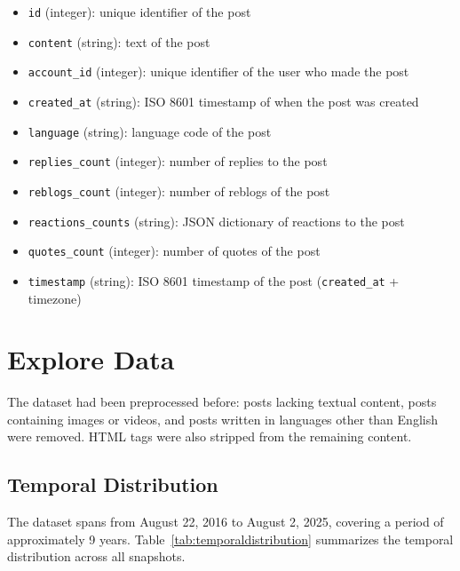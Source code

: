 \begin{itemize}
	\item \texttt{id} (integer): unique identifier of the post
	\item \texttt{content} (string): text of the post
	\item \texttt{account\_id} (integer): unique identifier of the user who made the post
	\item \texttt{created\_at} (string): ISO 8601 timestamp of when the post was created
	\item \texttt{language} (string): language code of the post
	\item \texttt{replies\_count} (integer): number of replies to the post
	\item \texttt{reblogs\_count} (integer): number of reblogs of the post
	\item \texttt{reactions\_counts} (string): JSON dictionary of reactions to the post
	\item \texttt{quotes\_count} (integer): number of quotes of the post
	\item \texttt{timestamp} (string): ISO 8601 timestamp of the post (\texttt{created\_at} + timezone)
\end{itemize}


\section{Explore Data}


The dataset had been preprocessed before: posts lacking textual content, posts containing images or videos, and posts written in languages other than English were removed. HTML tags were also stripped from the remaining content.


\subsection*{Temporal Distribution}

The dataset spans from August 22, 2016 to August 2, 2025, covering a period of approximately 9 years. Table~\ref{tab:temporaldistribution} summarizes the temporal distribution across all snapshots.

